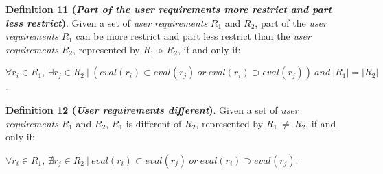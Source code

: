 \bigskip
\noindent \textbf{Definition 11 (\textsl{Part of the user requirements more restrict and part less restrict})}.
Given a set of \textsl{user requirements} $R_{1}$ and $R_{2}$, part of the \textsl{user requirements} $R_{1}$ can be more restrict and part less restrict than the \textsl{user requirements} $R_{2}$, represented by $R_{1} \ \diamond \ R_{2}$, if and only if:
\begin{flushleft}
$\forall r_{i} \in R_{1}, \ \exists r_{j} \in R_{2} \ \vert \ (eval (r_{i}) \subset eval(r_{j}) \ or \ eval (r_{i}) \supset eval(r_{j})) \ and \ \vert R_{1} \vert = \vert R_{2} \vert$.
\end{flushleft}

\bigskip
\noindent \textbf{Definition 12 (\textsl{User requirements different})}.
Given a set of \textsl{user requirements} $R_{1}$ and $R_{2}$, $R_{1}$ is different of $R_{2}$, represented by $R_{1} \ \neq \ R_{2}$, if and only if:
\begin{flushleft}
$\forall r_{i} \in R_{1}, \ \nexists r_{j} \in R_{2} \ \vert \ eval (r_{i}) \subset eval(r_{j}) \ or \ eval (r_{i}) \supset eval(r_{j})$.
\end{flushleft}
%
%
%


